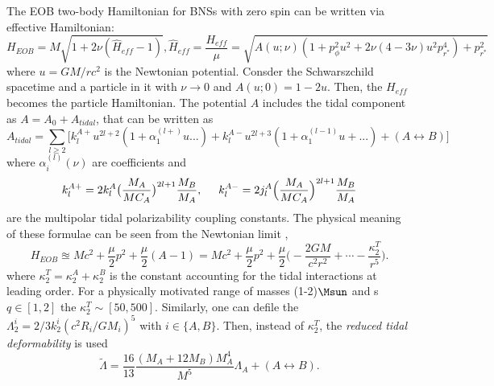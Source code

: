 The \ac{EOB} two-body Hamiltonian for \acp{BNS} with zero spin can be written via effective Hamiltonian:
%
\begin{equation}
    H_{EOB} = M\sqrt{1 + 2\nu (\hat{H}_{eff} - 1)}, 
    \hat{H}_{eff} = \frac{H_{eff}}{\mu} = \sqrt{A(u;\nu)(1 + p_{\phi}^2u^2 + 2\nu(4-3\nu)u^2p_{r^*}^4) + p_{r^*}^2}
\end{equation}
%
where $u=GM/rc^2$ is the Newtonian potential. 
Consder the Schwarszchild spacetime and a particle in it with $\nu\rightarrow0$ and 
$A(u;0) = 1-2u$. Then, the $H_{eff}$ becomes the particle Hamiltonian.
%
%
The potential $A$ includes the tidal component as $A = A_0 + A_{tidal}$, that can be 
written as \cite{40}
%
\begin{equation}
    A_{tidal} = \sum_{l\geq 2}\Big[ k_l^{A+}u^{2l+2}(1+\alpha_1^{(l+)}u ... ) + k_{l}^{A-}u^{2l+3}(1+\alpha_1^{(l-1)}u + ...) + (A\leftrightarrow B) \Big]
\end{equation}
%
where $\alpha_i^{(l)}(\nu)$ are coefficients and 
%
\begin{equation}
    k_{l}^{A+} = 2k_l^A\big( \frac{M_A}{MC_A} \big)^{2l+1}\frac{M_B}{M_A}, \hspace{5mm} k_l^{A-} = 2j_l^A\Big( \frac{M_A}{M C_A} \Big)^{2l + 1} \frac{M_B}{M_A}
\end{equation}
%
are the multipolar tidal polarizability coupling constants. 
%
The physical meaning of these formulae can be seen from the Newtonian limit \ie, 
%
\begin{equation}
    H_{EOB} \approxeq Mc^2 + \frac{\mu}{2}p^2 + \frac{\mu}{2}(A-1) = Mc^2 + \frac{\mu}{2}p^2 + \frac{\mu}{2}\Big( -\frac{2 G M}{c^2 r^2} + \cdots - \frac{\kappa_2^T}{r^5} \Big).
\end{equation}
%
where $\kappa_2^T = \kappa_2^A + \kappa_2^B$ is the constant accounting for the tidal 
interactions at leading order.
For a physically motivated range of masses (1-2)$\Msun$ and \mr{}s $q\in[1,2]$ the 
$\kappa_2^T\sim[50,500]$. 
Similarly, one can defile the $\Lambda_2^i = 2/3 k_2^i (c^2 R_i/GM_i)^5$ with $i\in\{A,B\}$.
Then, instead of $\kappa_2^T$, the \textit{reduced tidal deformability} is used
%
\begin{equation}
    \tilde{\Lambda} = \frac{16}{13}\frac{(M_A + 12M_B)M_A^4}{M^5}\Lambda_A + (A\leftrightarrow B).
\end{equation}
%

